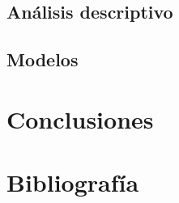 \documentclass[12pt,twoside]{templates/facsothesis}
\begin{document}
\hypertarget{anuxe1lisis-descriptivo}{%
\section{Análisis descriptivo}\label{anuxe1lisis-descriptivo}}

\hypertarget{modelos}{%
\section{Modelos}\label{modelos}}

\hypertarget{conclusiones}{%
\chapter{Conclusiones}\label{conclusiones}}

\hypertarget{bibliografuxeda}{%
\chapter*{Bibliografía}\label{bibliografuxeda}}



\end{document}
